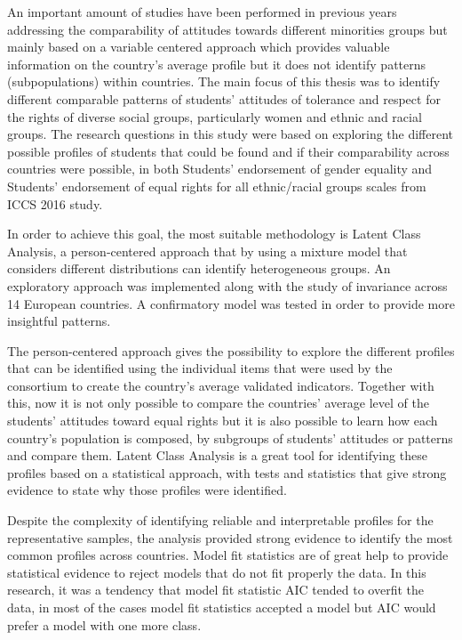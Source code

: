 \documentclass[12pt,a4paper,oneside]{reedthesis}
\begin{document}
An important amount of studies have been performed in previous years addressing the comparability of attitudes towards different minorities groups but mainly based on a variable centered approach which provides valuable information on the country's average profile but it does not identify patterns (subpopulations) within countries. The main focus of this thesis was to identify different comparable patterns of students' attitudes of tolerance and respect for the rights of diverse social groups, particularly women and ethnic and racial groups. The research questions in this study were based on exploring the different possible profiles of students that could be found and if their comparability across countries were possible, in both Students' endorsement of gender equality and Students' endorsement of equal rights for all ethnic/racial groups scales from ICCS 2016 study.

In order to achieve this goal, the most suitable methodology is Latent Class Analysis, a person-centered approach that by using a mixture model that considers different distributions can identify heterogeneous groups. An exploratory approach was implemented along with the study of invariance across 14 European countries. A confirmatory model was tested in order to provide more insightful patterns.

The person-centered approach gives the possibility to explore the different profiles that can be identified using the individual items that were used by the consortium to create the country's average validated indicators. Together with this, now it is not only possible to compare the countries' average level of the students' attitudes toward equal rights but it is also possible to learn how each country's population is composed, by subgroups of students' attitudes or patterns and compare them. Latent Class Analysis is a great tool for identifying these profiles based on a statistical approach, with tests and statistics that give strong evidence to state why those profiles were identified.

Despite the complexity of identifying reliable and interpretable profiles for the representative samples, the analysis provided strong evidence to identify the most common profiles across countries. Model fit statistics are of great help to provide statistical evidence to reject models that do not fit properly the data. In this research, it was a tendency that model fit statistic AIC tended to overfit the data, in most of the cases model fit statistics accepted a model but AIC would prefer a model with one more class.
\end{document}
